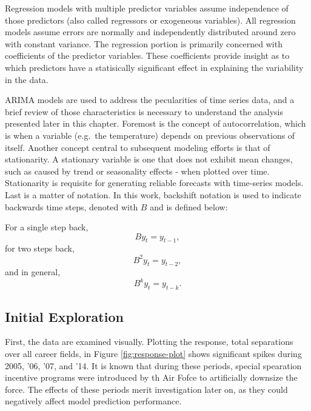 \documentclass[12pt,letterpaper,toc=flat,oneside]{report}
\theoremstyle{definition}
\theoremstyle{definition}
\theoremstyle{definition}
\theoremstyle{remark}
\begin{document}
Regression models with multiple predictor variables assume independence
of those predictors (also called regressors or exogeneous variables).
All regression models assume errors are normally and independently
distributed around zero with constant variance. The regression portion
is primarily concerned with coefficients of the predictor variables.
These coefficients provide insight as to which predictors have a
statisically significant effect in explaining the variability in the
data.

ARIMA models are used to address the pecularities of time series data,
and a brief review of those characteristics is necessary to understand
the analysis presented later in this chapter. Foremost is the concept of
autocorrelation, which is when a variable (e.g.~the temperature) depends
on previous observations of itself. Another concept central to
subsequent modeling efforts is that of stationarity. A stationary
variable is one that does not exhibit mean changes, such as caused by
trend or seasonality effects - when plotted over time. Stationarity is
requisite for generating reliable forecasts with time-series models.
Last is a matter of notation. In this work, backshift notation is used
to indicate backwards time steps, denoted with \(B\) and is defined
below:

For a single step back, \[ By_t = y_{t-1}, \] for two steps back,
\[ B^2y_t = y_{t-2}, \] and in general, \[ B^ky_t = y_{t-k}. \]

\hypertarget{initial-exploration}{%
\subsection{Initial Exploration}\label{initial-exploration}}

First, the data are examined visually. Plotting the response, total
separations over all career fields, in Figure \ref{fig:response-plot}
shows significant spikes during 2005, '06, '07, and '14. It is known
that during these periods, special spearation incentive programs were
introduced by th Air Fofce to artificially downsize the force. The
effects of these periods merit investigation later on, as they could
negatively affect model prediction performance.
\end{document}
